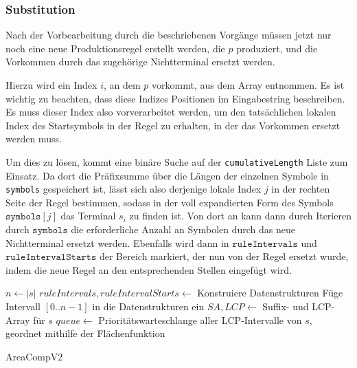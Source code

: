 \subsubsection{Substitution}

Nach der Vorbearbeitung durch die beschriebenen Vorgänge müssen jetzt nur noch eine neue Produktionsregel erstellt werden, die $p$ produziert, und die Vorkommen durch das zugehörige Nichtterminal ersetzt werden.

Hierzu wird ein Index $i$, an dem $p$ vorkommt, aus dem Array entnommen. Es ist wichtig zu beachten, dass diese Indizes Positionen im Eingabestring beschreiben. Es muss dieser Index also vorverarbeitet werden, um den tatsächlichen lokalen Index des Startsymbols in der Regel zu erhalten, in der das Vorkommen ersetzt werden muss.

Um dies zu lösen, kommt eine binäre Suche auf der \texttt{cumulativeLength} Liste zum Einsatz. Da dort die Präfixsumme über die Längen der einzelnen Symbole in \texttt{symbols} gespeichert ist, 
lässt sich also derjenige lokale Index $j$ in der rechten Seite der Regel bestimmen, sodass in der voll expandierten Form des Symbols $\texttt{symbols}[j]$ das Terminal $s_{i}$ zu finden ist.
Von dort an kann dann durch Iterieren durch $\texttt{symbols}$ die erforderliche Anzahl an Symbolen durch das neue Nichtterminal ersetzt werden.
Ebenfalls wird dann in $\texttt{ruleIntervals}$ und $\texttt{ruleIntervalStarts}$ der Bereich markiert, der nun von der Regel ersetzt wurde, indem die neue Regel an den entsprechenden Stellen eingefügt wird.

\begin{algorithm}[t]
    $n \leftarrow |s|$\;
    $ruleIntervals, ruleIntervalStarts \leftarrow$ Konstruiere Datenstrukturen\;
    Füge Intervall $[0..n-1]$ in die Datenstrukturen ein\;
    $SA, LCP \leftarrow$ Suffix- und LCP-Array für $s$\;
    $queue \leftarrow$ Prioritätswarteschlange aller LCP-Intervalle von $s$, geordnet mithilfe der Flächenfunktion\;

    \caption{AreaCompV2}
    \label{v2algo}
\end{algorithm}


